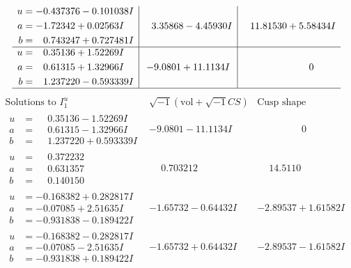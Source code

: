 \documentclass[1p]{elsarticle_modified}
\theoremstyle{definition}
\newcommand{\I}{\sqrt{-1}}
\begin{document}
$$\begin{array}{c|c|c}
\begin{aligned}
u &= -0.437376 - 0.101038 I \\
a &= -1.72342 + 0.02563 I \\
b &= \phantom{-}0.743247 + 0.727481 I\end{aligned}
 & \phantom{-}3.35868 - 4.45930 I & \phantom{-}11.81530 + 5.58434 I \\ \hline\begin{aligned}
u &= \phantom{-}0.35136 + 1.52269 I \\
a &= \phantom{-}0.61315 + 1.32966 I \\
b &= \phantom{-}1.237220 - 0.593339 I\end{aligned}
 & -9.0801 + 11.1134 I & \phantom{-0.000000 } 0\\
 \hline 
 \end{array}$$\newpage$$\begin{array}{c|c|c}  
\text{Solutions to }I^u_{1}& \I (\text{vol} + \sqrt{-1}CS) & \text{Cusp shape}\\
 \hline 
\begin{aligned}
u &= \phantom{-}0.35136 - 1.52269 I \\
a &= \phantom{-}0.61315 - 1.32966 I \\
b &= \phantom{-}1.237220 + 0.593339 I\end{aligned}
 & -9.0801 - 11.1134 I & \phantom{-0.000000 } 0 \\ \hline\begin{aligned}
u &= \phantom{-}0.372232\phantom{ +0.000000I} \\
a &= \phantom{-}0.631357\phantom{ +0.000000I} \\
b &= \phantom{-}0.140150\phantom{ +0.000000I}\end{aligned}
 & \phantom{-}0.703212\phantom{ +0.000000I} & \phantom{-}14.5110\phantom{ +0.000000I} \\ \hline\begin{aligned}
u &= -0.168382 + 0.282817 I \\
a &= -0.07085 + 2.51635 I \\
b &= -0.931838 - 0.189422 I\end{aligned}
 & -1.65732 - 0.64432 I & -2.89537 + 1.61582 I \\ \hline\begin{aligned}
u &= -0.168382 - 0.282817 I \\
a &= -0.07085 - 2.51635 I \\
b &= -0.931838 + 0.189422 I\end{aligned}
 & -1.65732 + 0.64432 I & -2.89537 - 1.61582 I \\ \hline\begin{aligned}

\end{aligned}
\end{array}$$
\end{document}
